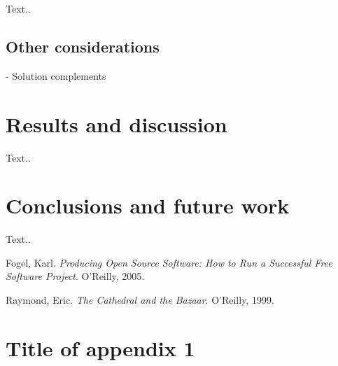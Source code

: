 \documentclass[a4paper, 12pt]{book}
\begin{document}
Text..

\section{Other considerations}
\label{sec:considerations}

- Solution complements

%
\chapter{Results and discussion}
\label{chap:results}

Text..


%
\chapter{Conclusions and future work}
\label{chap:conclusions}

Text..

%
\renewcommand{\bibname}{References}

\begin{thebibliography}{25}
  

   Fogel, Karl. \textit{Producing Open Source Software: How to Run a Successful Free Software Project}. O'Reilly, 2005.

   Raymond, Eric. \textit{The Cathedral and the Bazaar}. O'Reilly, 1999.

\end{thebibliography}

%
\appendix
\chapter{Title of appendix 1}
\label{app:apendix1}
\end{document}
